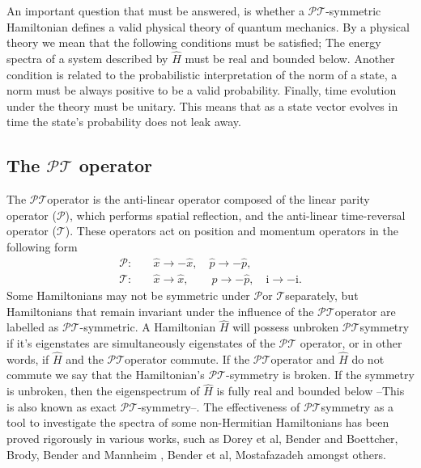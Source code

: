 \documentclass[12pt, a4paper]{report}
\newcommand\PT{\(\mathcal{PT}\)}
\newcommand\PP{\(\mathcal{P}\)}
\newcommand\TT{\(\mathcal{T}\)}
\begin{document}
An important question that must be answered, is whether a \PT-symmetric Hamiltonian defines a valid physical theory of quantum mechanics. By a physical theory we mean that the following conditions must be satisfied; The energy spectra of a system described by $\hat{H}$ must be real and bounded below. Another condition is related to the probabilistic interpretation of the norm of a state, a norm must be always positive to be a valid probability. Finally, time evolution under the theory must be unitary. This means that as a state vector evolves in time the state's probability does not leak away\cite{MustaHbeHermitian}\cite{MakingSense}.

\subsection{The \texorpdfstring{$\mathcal{PT}$}\: operator}
The \PT\:operator is the anti-linear operator composed of the linear parity operator (\PP), which performs spatial reflection, and the anti-linear time-reversal operator (\TT). These operators act on position and momentum operators in the following form
\begin{equation}\label{eq:1.2}
\begin{split}
\mathcal{P}:& \quad\hat{x} \rightarrow -\hat{x},\quad \hat{p} \rightarrow -\hat{p},\\
\mathcal{T}:& \quad\hat{x} \rightarrow \hat{x},\quad\quad \hat{p} \rightarrow -\hat{p},\quad \mathrm{i} \rightarrow -\mathrm{i}.
\end{split}
\end{equation}
Some Hamiltonians may not be symmetric under \PP\:or \TT\:separately, but Hamiltonians that remain invariant under the influence of the \PT\:operator are labelled as \PT-symmetric. A Hamiltonian $\hat{H}$ will possess unbroken \PT\:symmetry if it's eigenstates are simultaneously eigenstates of the \PT\: operator, or in other words, if $\hat{H}$ and the \PT\:operator commute. If the \PT\:operator and $\hat{H}$ do not commute we say that the Hamiltonian's \PT-symmetry is broken\cite{MakingSense}\cite{ComplexExtension}\cite{MustaHbeHermitian}. If the symmetry is unbroken, then the eigenspectrum of $\hat{H}$ is fully real and bounded below --This is also known as exact \PT-symmetry--. The effectiveness of \PT\:symmetry as a tool to investigate the spectra of some non-Hermitian Hamiltonians has been proved rigorously in various works, such as Dorey et al\cite{Dorey_2001}, Bender and Boettcher\cite{Bender1998}, Brody\cite{Brody_2016}, Bender and Mannheim \cite{Bender_2010}, Bender et al\cite{PTsymmetricQM}, Mostafazadeh\cite{Mostafazadeh}\cite{Mostafazadeh2} amongst others. 
\end{document}
